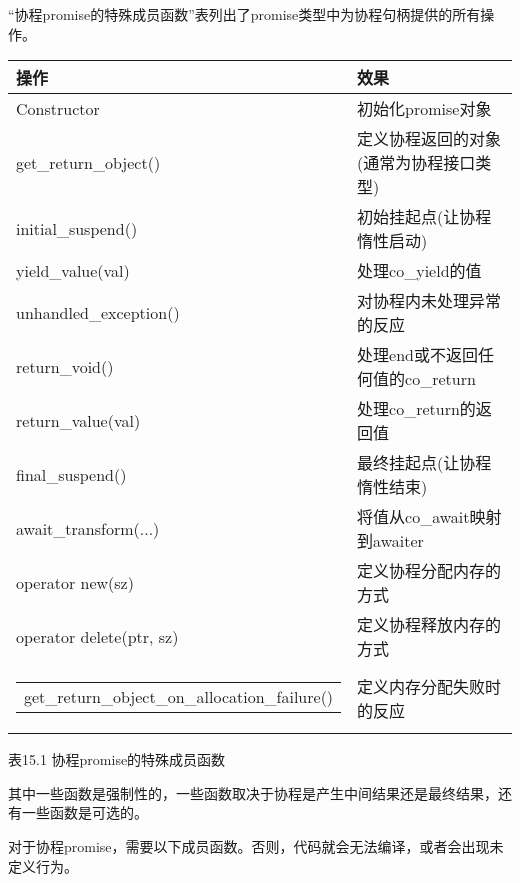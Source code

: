 
“协程promise的特殊成员函数”表列出了promise类型中为协程句柄提供的所有操作。

\begin{longtable}[c]{|l|l|}
\hline
\textbf{操作}       & \textbf{效果}                                          \\ \hline
\endfirsthead
%
\endhead
%
Constructor              & 初始化promise对象                                  \\ \hline
get\_return\_object() &
定义协程返回的对象(通常为协程接口类型) \\ \hline
initial\_suspend()       & 初始挂起点(让协程惰性启动) \\ \hline
yield\_value(val)        & 处理co\_yield的值                        \\ \hline
unhandled\_exception()   & 对协程内未处理异常的反应  \\ \hline
return\_void()           & 处理end或不返回任何值的co\_return  \\ \hline
return\_value(val)       & 处理co\_return的返回值                \\ \hline
final\_suspend()         & 最终挂起点(让协程惰性结束)     \\ \hline
await\_transform(...)    & 将值从co\_await映射到awaiter                   \\ \hline
operator new(sz)         & 定义协程分配内存的方式           \\ \hline
operator delete(ptr, sz) & 定义协程释放内存的方式               \\ \hline
\begin{tabular}[c]{@{}l@{}}get\_return\_object\_on\_allocation\_failure()\end{tabular} &定义内存分配失败时的反应 \\ \hline
\end{longtable}

\begin{center}
表15.1 协程promise的特殊成员函数
\end{center}

其中一些函数是强制性的，一些函数取决于协程是产生中间结果还是最终结果，还有一些函数是可选的。


对于协程promise，需要以下成员函数。否则，代码就会无法编译，或者会出现未定义行为。

